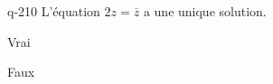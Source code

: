\begin{truefalse}{q-210}
L'équation $2z=\overline z$ a une unique solution.
\item* Vrai
\item Faux
\end{truefalse}

